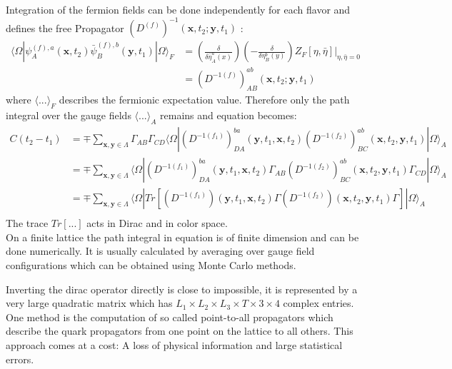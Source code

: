         \noindent
        Integration of the fermion fields can be done independently for each flavor and defines the free Propagator $(D^{(f)})^{-1}(\textbf{x},t_2;\textbf{y}, t_1)$ \cite{qcd2_script_wagner}:
        \begin{equation}
            \begin{aligned}
                \langle\Omega|\psi^{(f),a}_A(\textbf{x}, t_2)\bar{\psi}^{(f),b}_B(\textbf{y}, t_1)|\Omega\rangle_F &= 
                (\frac{\delta}{\delta\bar{\eta}^a_A(x)})(-\frac{\delta}{\delta{\eta}^b_B(y)})Z_F[\eta,\bar{\eta}]\Big |_{\eta,\bar{\eta}=0}\\
                &= (D^{-1(f)})_{AB}^{ab}(\textbf{x},t_2;\textbf{y}, t_1)
            \end{aligned}
        \end{equation}
        where $\langle...\rangle_F$ describes the fermionic expectation value. Therefore only the path integral over the gauge fields $\langle...\rangle_A$ remains and equation  becomes:
        \begin{equation}\label{correlator_final}
            \begin{aligned}
                C(t_2 - t_1) &= \mp \sum_{\textbf{x},\textbf{y}\in\Lambda}\Gamma_{AB}\Gamma_{CD}
                \langle\Omega|(D^{-1(f_1)})_{DA}^{ba}(\textbf{y},t_1,\textbf{x},t_2)
                (D^{-1(f_2)})_{BC}^{ab}(\textbf{x},t_2,\textbf{y},t_1)|\Omega\rangle_A\\
                &= \mp \sum_{\textbf{x},\textbf{y}\in\Lambda}
                \langle\Omega|(D^{-1(f_1)})_{DA}^{ba}(\textbf{y},t_1,\textbf{x},t_2)\Gamma_{AB}
                (D^{-1(f_2)})_{BC}^{ab}(\textbf{x},t_2,\textbf{y},t_1)\Gamma_{CD}|\Omega\rangle_A\\
                &= \mp \sum_{\textbf{x},\textbf{y}\in\Lambda}
                \langle\Omega|Tr[(D^{-1(f_1)})(\textbf{y},t_1,\textbf{x},t_2)\Gamma
                (D^{-1(f_2)})(\textbf{x},t_2,\textbf{y},t_1)\Gamma]|\Omega\rangle_A\\
            \end{aligned}
        \end{equation}
        The trace $Tr[...]$ acts in Dirac and in color space.\\
        
        \noindent
        On a finite lattice the path integral in equation  is of finite dimension and can be done numerically. It is usually calculated by averaging over gauge field configurations which can be obtained using Monte Carlo methods.
        
        Inverting the dirac operator directly is close to impossible, it is represented by a very large quadratic matrix which has $L_1 \times L_2 \times L_3 \times T \times 3 \times 4$ complex entries. One method is the computation of so called point-to-all propagators \cite{four_quark_correlation_functions} which describe the quark propagators from one point on the lattice to all others. This approach comes at a cost: A loss of physical information and large statistical errors.